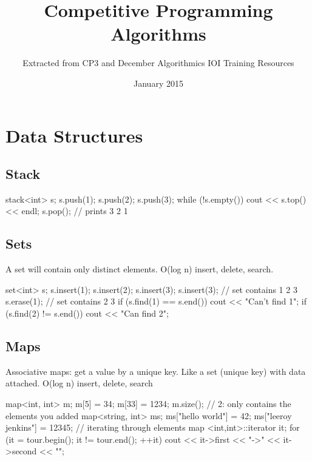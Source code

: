 \documentclass{article}
\title{Competitive Programming Algorithms}
\author{Extracted from CP3 and December Algorithmics IOI Training Resources}
\date{January 2015}
\begin{document}
\maketitle

\section{Data Structures}
\subsection{Stack}
\begin{mylisting}{}
stack<int> s;
s.push(1); s.push(2); s.push(3);
while (!s.empty()) {
    cout << s.top() << endl;
    s.pop();
} // prints 3 2 1
\end{mylisting}

\subsection{Sets}
A set will contain only distinct elements. O(log n) insert, delete, search.
\begin{mylisting}{}
set<int> s;
s.insert(1); s.insert(2); s.insert(3); s.insert(3); // set contains 1 2 3
s.erase(1);                                         // set contains 2 3
if (s.find(1) == s.end()) cout << "Can't find 1\n";
if (s.find(2) != s.end()) cout << "Can find 2\n";
\end{mylisting}

\subsection{Maps}
Associative maps: get a value by a unique key. Like a set (unique key) with data attached. O(log n) insert, delete, search
\begin{mylisting}{}
map<int, int> m;
m[5] = 34; m[33] = 1234;
m.size(); // 2: only contains the elements you added
map<string, int> ms;
ms["hello world"] = 42;
ms["leeroy jenkins"] = 12345;
// iterating through elements
map <int,int>::iterator it;
for (it = tour.begin(); it != tour.end(); ++it){
	cout << it->first << "->" << it->second << "\n";
}
\end{mylisting}
\end{document}
